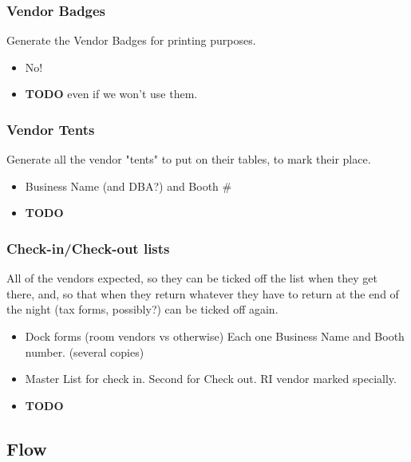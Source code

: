 \documentclass[captions=tablesignature]{scrartcl}
\begin{document}
\subsubsection{Vendor Badges}
\label{sec-3-1-17}
Generate the Vendor Badges for printing purposes.
\begin{itemize}
\item No!
\end{itemize}
\begin{itemize}
\item {\bfseries\sffamily TODO} even if we won't use them.
\label{sec-3-1-17-1}
\end{itemize}

\subsubsection{Vendor Tents}
\label{sec-3-1-18}
Generate all the vendor "tents" to put on their tables, to mark
their place.
\begin{itemize}
\item Business Name (and DBA?) and Booth \#
\end{itemize}
\begin{itemize}
\item {\bfseries\sffamily TODO} 
\label{sec-3-1-18-1}
\end{itemize}

\subsubsection{Check-in/Check-out lists}
\label{sec-3-1-19}
All of the vendors expected, so they can be ticked off the list
when they get there, and, so that when they return whatever they
have to return at the end of the night (tax forms, possibly?) can
be ticked off again.
\begin{itemize}
\item Dock forms (room vendors vs otherwise) Each one Business Name
and Booth number.  (several copies)
\item Master List for check in.  Second for Check out. RI vendor
marked specially.
\end{itemize}
\begin{itemize}
\item {\bfseries\sffamily TODO} 
\label{sec-3-1-19-1}
\end{itemize}

\subsection{Flow}
\label{sec-3-2}
\end{document}
